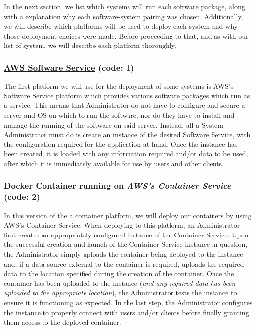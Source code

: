 In the next section, we list which systems will run each software package, along with a explanation why each software-system pairing was chosen.  Additionally, we will describe which platforms will be used to deploy each system and why those deployment choices were made.  Before proceeding to that, and as with our list of system, we will describe each platform thoroughly.


\subsubsection{\underline{AWS Software Service} (code: \textbf{1})}  
The first platform we will use for the deployment of some systems is AWS's Software Service platform which provides various software packages which run as a service.  This means that Administrator do not have to configure and secure a server and OS on which to run the software, nor do they have to install and manage the running of the software on said server.  Instead, all a System Administrator must do is create an instance of the desired Software Service, with the configuration required for the application at hand.  Once the instance has been created, it is loaded with any information required and/or data to be used, after which it is immediately available for use by users and other clients. 


\subsubsection{\underline{Docker Container running on \emph{AWS's Container Service}} (code: \textbf{2})}
 In this version of the a container platform, we will deploy our containers by using AWS's Container Service.  When deploying to this platform, an Administrator first creates an appropriately configured instance of the Container Service.  Upon the successful creation and launch of the Container Service instance in question, the Administrator simply uploads the container being deployed to the instance and, if a data-source external to the container is required, uploads the required data to the location specified during the creation of the container.  Once the container has been uploaded to the instance (\emph{and any required data has been uploaded to the appropriate location}), the Administrator tests the instance to ensure it is functioning as expected.  In the last step, the Administrator configures the instance to properly connect with users and/or clients before finally granting them access to the deployed container. 


